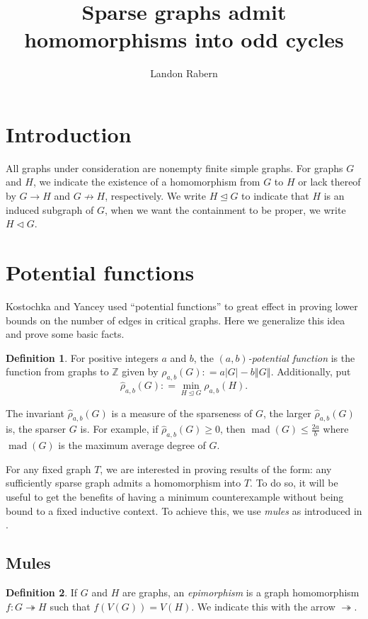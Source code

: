 \documentclass[12pt]{amsart}
\title{Sparse graphs admit homomorphisms into odd cycles}
\author{Landon Rabern}
\date{}
\theoremstyle{plain}
\theoremstyle{definition}
\newtheorem{defn}{Definition}
\theoremstyle{remark}
\newcommand{\IZ}{\mathbb{Z}}
\newcommand{\surj}{\twoheadrightarrow}
\newcommand{\card}[1]{\left|#1\right|}
\newcommand{\size}[1]{\left\Vert#1\right\Vert}
\newcommand{\funcsurj}[3]{#1\colon #2 \surj #3}
\newcommand{\DefinedAs}{\mathrel{\mathop:}=}
\newcommand{\mad}{\operatorname{mad}}
\begin{document}
\begin{abstract}
\end{abstract}
\maketitle

\section{Introduction}
All graphs under consideration are nonempty finite simple graphs. For graphs $G$ and $H$, we indicate the existence of a homomorphism from $G$ to $H$ or lack thereof by $G \rightarrow H$ and $G \not \rightarrow H$, respectively.  We write $H \unlhd G$ to indicate that $H$ is an induced subgraph of $G$, when we want the containment to be proper, we write $H \lhd G$. 

\section{Potential functions}
Kostochka and Yancey \cite{kostochkayancey2012ore} used ``potential functions'' to great effect in proving lower bounds on the number of edges in critical graphs. Here we generalize this idea and prove some basic facts.

\begin{defn}
For positive integers $a$ and $b$, the \emph{$(a,b)$-potential function} is the function from graphs to $\IZ$ given by $\rho_{a,b}(G) \DefinedAs a\card{G} - b\size{G}$.  Additionally, put
\[\hat{\rho}_{a,b}(G) \DefinedAs \min_{H \unlhd G} \rho_{a,b}(H).\]
\end{defn}

The invariant $\hat{\rho}_{a,b}(G)$ is a measure of the sparseness of $G$, the larger $\hat{\rho}_{a,b}(G)$ is, the sparser $G$ is.  For example, if $\hat{\rho}_{a,b}(G) \ge 0$, then $\mad(G) \le \frac{2a}{b}$ where $\mad(G)$ is the maximum average degree of $G$.

For any fixed graph $T$, we are interested in proving results of the form: any sufficiently sparse graph admits a homomorphism into $T$.  To do so, it will be useful to get the benefits of having a minimum counterexample without being bound to a fixed inductive context.  To achieve this, we use \emph{mules} as introduced in \cite{CranstonR-equiv, raberndiss}. 

\subsection{Mules}
\begin{defn}
\label{epi}
If $G$ and $H$ are graphs, an \emph{epimorphism} is a graph homomorphism $\funcsurj{f}{G}{H}$ such that $f(V(G)) = V(H)$.  We indicate this with the arrow $\surj$.
\end{defn}
\end{document}
